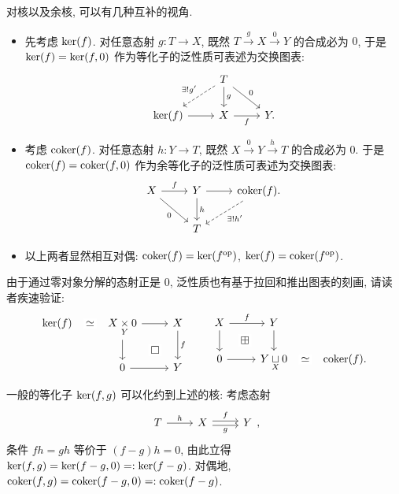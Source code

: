 对核以及余核, 可以有几种互补的视角.
\begin{itemize}
	\item 先考虑 $\operatorname{ker}(f)$. 对任意态射 $g: T \to X$, 既然 $T \xrightarrow{g} X \xrightarrow{0} Y$ 的合成必为 $0$, 于是 $\operatorname{ker}(f) = \operatorname{ker}(f,0)$ 作为等化子的泛性质可表述为交换图表:
	\[\begin{tikzcd}
		& T \arrow[dashrightarrow, ld, "{\exists! g'}"'] \arrow[d, "g"] \arrow[rd, "0"] & \\
		\Ker(f) \arrow[r] & X \arrow[r, "f"'] & Y .
	\end{tikzcd}\]
	\item 考虑 $\operatorname{coker}(f)$. 对任意态射 $h: Y \to T$, 既然 $X \xrightarrow{0} Y \xrightarrow{h} T$ 的合成必为 $0$. 于是 $\operatorname{coker}(f) = \operatorname{coker}(f, 0)$ 作为余等化子的泛性质可表述为交换图表:
	\[\begin{tikzcd}
		X \arrow[r, "f"] \arrow[rd, "0"'] & Y \arrow[r] \arrow[d, "h"] & \Coker(f) \arrow[dashrightarrow, ld, "{\exists! h'}"] . \\
		& T &
	\end{tikzcd}\]
	\item 以上两者显然相互对偶: $\operatorname{coker}(f) = \operatorname{ker}(f^{\operatorname{op}})$, $\operatorname{ker}(f) = \operatorname{coker}(f^{\operatorname{op}})$.
\end{itemize}

由于通过零对象分解的态射正是 $0$, 泛性质也有基于拉回和推出图表的刻画, 请读者疾速验证:
\begin{equation}\label{eqn:Ker-Coker-triangles}
	\begin{tikzcd}
		\Ker(f) \arrow[phantom, r, "\simeq" description] & X \dtimes{Y} 0 \arrow[r] \arrow[d] \arrow[phantom, rd, "\Box" description] & X \arrow[d, "f"] \\
		& 0 \arrow[r] & Y
	\end{tikzcd} \qquad \begin{tikzcd}
		X \arrow[r, "f"] \arrow[d] & Y \arrow[d] & \\
		0 \arrow[r] & Y \dsqcup{X} 0 \arrow[phantom, lu, "\boxplus" description] & \Coker(f) \arrow[phantom, l, "\simeq" description] .
\end{tikzcd}\end{equation}

\begin{remark}\label{rem:equalizer-Ker}
	一般的等化子 $\operatorname{ker}(f,g)$ 可以化约到上述的核: 考虑态射
	\[\begin{tikzcd}
	T \arrow[r, "h"] & X \arrow[r, yshift=0.2em, "f"] \arrow[r, yshift=-0.2em, "g"'] & Y
	\end{tikzcd}, \]
	条件 $fh = gh$ 等价于 $(f-g)h = 0$, 由此立得 $\operatorname{ker}(f,g) = \operatorname{ker}(f-g, 0) =: \operatorname{ker}(f-g)$. 对偶地, $\operatorname{coker}(f,g) = \operatorname{coker}(f-g,0) =: \operatorname{coker}(f-g)$.
\end{remark}

